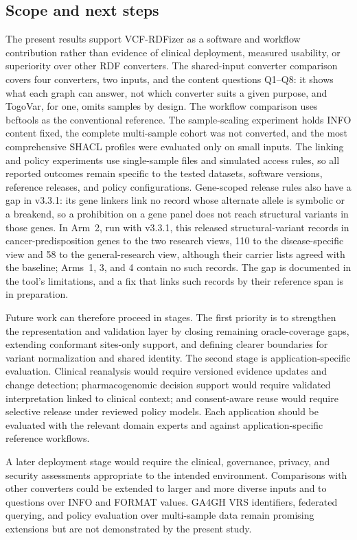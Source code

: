 \documentclass[pdflatex,sn-mathphys-num]{sn-jnl}
\begin{document}
\subsection{Scope and next steps}\label{subsec:disc-scope}
The present results support VCF-RDFizer as a software and workflow contribution rather than evidence of clinical deployment, measured usability, or superiority over other RDF converters.
The shared-input converter comparison covers four converters, two inputs, and the content questions Q1--Q8: it shows what each graph can answer, not which converter suits a given purpose, and TogoVar, for one, omits samples by design.
The workflow comparison uses bcftools as the conventional reference.
The sample-scaling experiment holds INFO content fixed, the complete multi-sample cohort was not converted, and the most comprehensive SHACL profiles were evaluated only on small inputs.
The linking and policy experiments use single-sample files and simulated access rules, so all reported outcomes remain specific to the tested datasets, software versions, reference releases, and policy configurations.
Gene-scoped release rules also have a gap in v3.3.1: its gene linkers link no record whose alternate allele is symbolic or a breakend, so a prohibition on a gene panel does not reach structural variants in those genes.
In Arm~2, run with v3.3.1, this released structural-variant records in cancer-predisposition genes to the two research views, 110 to the disease-specific view and 58 to the general-research view, although their carrier lists agreed with the baseline; Arms~1, 3, and 4 contain no such records.
The gap is documented in the tool's limitations, and a fix that links such records by their reference span is in preparation.

Future work can therefore proceed in stages.
The first priority is to strengthen the representation and validation layer by closing remaining oracle-coverage gaps, extending conformant sites-only support, and defining clearer boundaries for variant normalization and shared identity.
The second stage is application-specific evaluation.
Clinical reanalysis would require versioned evidence updates and change detection; pharmacogenomic decision support would require validated interpretation linked to clinical context; and consent-aware reuse would require selective release under reviewed policy models.
Each application should be evaluated with the relevant domain experts and against application-specific reference workflows.

A later deployment stage would require the clinical, governance, privacy, and security assessments appropriate to the intended environment.
Comparisons with other converters could be extended to larger and more diverse inputs and to questions over INFO and FORMAT values.
GA4GH VRS identifiers, federated querying, and policy evaluation over multi-sample data remain promising extensions but are not demonstrated by the present study.
\end{document}
